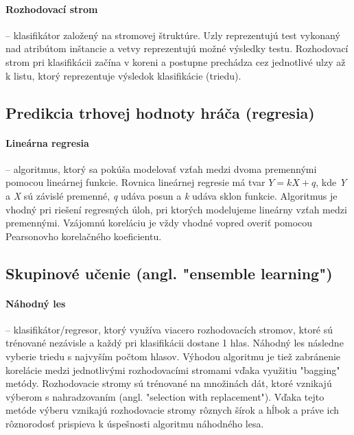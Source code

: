 \documentclass[runningheads]{llncs}
\begin{document}
\paragraph{Rozhodovací strom} --
klasifikátor založený na stromovej štruktúre. Uzly reprezentujú test vykonaný nad atribútom inštancie a vetvy reprezentujú možné výsledky testu. Rozhodovací strom pri klasifikácii začína v koreni a postupne prechádza cez jednotlivé ulzy až k listu, ktorý reprezentuje výsledok klasifikácie (triedu). 

\subsection{Predikcia trhovej hodnoty hráča (regresia)}

\paragraph{Lineárna regresia} --
algoritmus, ktorý sa pokúša modelovať vzťah medzi dvoma premennými pomocou lineárnej funkcie. Rovnica lineárnej regresie má tvar $Y = kX + q$, kde \textit{Y} a \textit{X} sú závislé premenné, \textit{q} udáva posun a \textit{k} udáva sklon funkcie. Algoritmus je vhodný pri riešení regresných úloh, pri ktorých modelujeme lineárny vzťah medzi premennými. Vzájomnú koreláciu je vždy vhodné vopred overiť pomocou Pearsonovho korelačného koeficientu. 

\subsection{Skupinové učenie (angl. "ensemble learning")}

\paragraph{Náhodný les} --
klasifikátor/regresor, ktorý využíva viacero rozhodovacích stromov, ktoré sú trénované nezávisle a každý pri klasifikácii dostane 1 hlas. Náhodný les následne vyberie triedu s najvyším počtom hlasov. Výhodou algoritmu je tiež zabránenie korelácie medzi jednotlivými rozhodovacími stromami vďaka využitiu "bagging" metódy. Rozhodovacie stromy sú trénované na množinách dát, ktoré vznikajú výberom s nahradzovaním (angl. "selection with replacement"). Vďaka tejto metóde výberu vznikajú rozhodovacie stromy rôznych šírok a hĺbok a práve ich rôznorodosť prispieva k úspešnosti algoritmu náhodného lesa.
\end{document}
